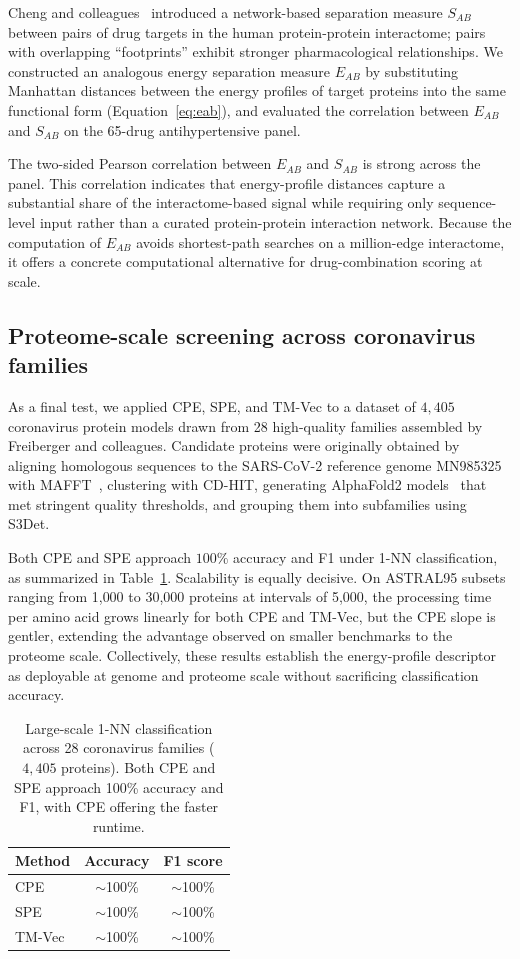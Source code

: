 \documentclass[11pt]{article}
\begin{document}
Cheng and colleagues~\citep{zhou2020network} introduced a
network-based separation measure $S_{AB}$ between pairs of drug targets in
the human protein-protein interactome; pairs with overlapping
``footprints'' exhibit stronger pharmacological relationships. We
constructed an analogous energy separation measure $E_{AB}$ by substituting
Manhattan distances between the energy profiles of target proteins into
the same functional form (Equation~\ref{eq:eab}), and evaluated the
correlation between $E_{AB}$ and $S_{AB}$ on the 65-drug antihypertensive
panel.

The two-sided Pearson correlation between $E_{AB}$ and $S_{AB}$ is strong
across the panel. This correlation indicates that energy-profile
distances capture a substantial share of the interactome-based signal
while requiring only sequence-level input rather than a curated
protein-protein interaction network. Because the computation of $E_{AB}$
avoids shortest-path searches on a million-edge interactome, it offers a
concrete computational alternative for drug-combination scoring at scale.

\subsection{Proteome-scale screening across coronavirus families}

As a final test, we applied CPE, SPE, and TM-Vec to a dataset of $4{,}405$
coronavirus protein models drawn from 28 high-quality families assembled
by Freiberger and colleagues. Candidate proteins were originally obtained
by aligning homologous sequences to the SARS-CoV-2 reference genome
MN985325 with MAFFT~\citep{rozewicki2021mafft}, clustering with CD-HIT,
generating AlphaFold2 models~\citep{jumper2021alphafold} that met stringent
quality thresholds, and grouping them into subfamilies using S3Det.

Both CPE and SPE approach $100\%$ accuracy and F1 under 1-NN
classification, as summarized in Table~\ref{tab:tab3}. Scalability is
equally decisive. On ASTRAL95 subsets ranging from 1{,}000 to 30{,}000
proteins at intervals of 5{,}000, the processing time per amino acid grows
linearly for both CPE and TM-Vec, but the CPE slope is gentler, extending
the advantage observed on smaller benchmarks to the proteome scale.
Collectively, these results establish the energy-profile descriptor as
deployable at genome and proteome scale without sacrificing classification
accuracy.

\begin{table}[t]
\centering
\caption{Large-scale 1-NN classification across 28 coronavirus families
($4{,}405$ proteins). Both CPE and SPE approach 100\% accuracy and F1,
with CPE offering the faster runtime.}
\label{tab:tab3}
\begin{tabular}{lcc}
\toprule
Method & Accuracy & F1 score \\
\midrule
CPE    & $\sim$100\% & $\sim$100\% \\
SPE    & $\sim$100\% & $\sim$100\% \\
TM-Vec & $\sim$100\% & $\sim$100\% \\
\bottomrule
\end{tabular}
\end{table}
\end{document}
